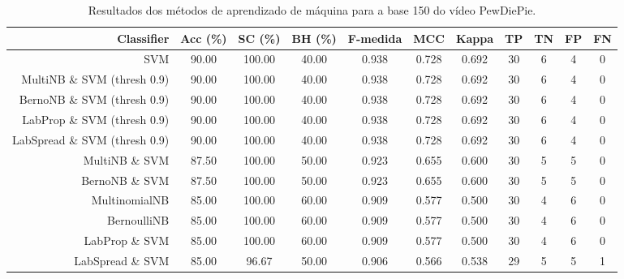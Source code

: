 \begin{table}[!htb]
\centering
\caption{Resultados dos métodos de aprendizado de máquina para a base 150 do vídeo PewDiePie.}
\label{tab:PewDiePie-150}
\begin{tabular}{r|c|c|c|c|c|c|c|c|c|c}
\hline\hline
Classifier & Acc (\%) & SC (\%) & BH (\%) & F-medida & MCC & Kappa & TP & TN & FP & FN \\ \hline
SVM & 90.00 & 100.00 & 40.00 & 0.938 & 0.728 & 0.692 & 30 & 6 & 4 & 0 \\ 
MultiNB \& SVM (thresh 0.9) & 90.00 & 100.00 & 40.00 & 0.938 & 0.728 & 0.692 & 30 & 6 & 4 & 0 \\ 
BernoNB \& SVM (thresh 0.9) & 90.00 & 100.00 & 40.00 & 0.938 & 0.728 & 0.692 & 30 & 6 & 4 & 0 \\ 
LabProp \& SVM (thresh 0.9) & 90.00 & 100.00 & 40.00 & 0.938 & 0.728 & 0.692 & 30 & 6 & 4 & 0 \\ 
LabSpread \& SVM (thresh 0.9) & 90.00 & 100.00 & 40.00 & 0.938 & 0.728 & 0.692 & 30 & 6 & 4 & 0 \\ 
MultiNB \& SVM & 87.50 & 100.00 & 50.00 & 0.923 & 0.655 & 0.600 & 30 & 5 & 5 & 0 \\ 
BernoNB \& SVM & 87.50 & 100.00 & 50.00 & 0.923 & 0.655 & 0.600 & 30 & 5 & 5 & 0 \\ 
MultinomialNB & 85.00 & 100.00 & 60.00 & 0.909 & 0.577 & 0.500 & 30 & 4 & 6 & 0 \\ 
BernoulliNB & 85.00 & 100.00 & 60.00 & 0.909 & 0.577 & 0.500 & 30 & 4 & 6 & 0 \\ 
LabProp \& SVM & 85.00 & 100.00 & 60.00 & 0.909 & 0.577 & 0.500 & 30 & 4 & 6 & 0 \\ 
LabSpread \& SVM & 85.00 & 96.67 & 50.00 & 0.906 & 0.566 & 0.538 & 29 & 5 & 5 & 1 \\ 
\hline\hline
\end{tabular}
\end{table}
